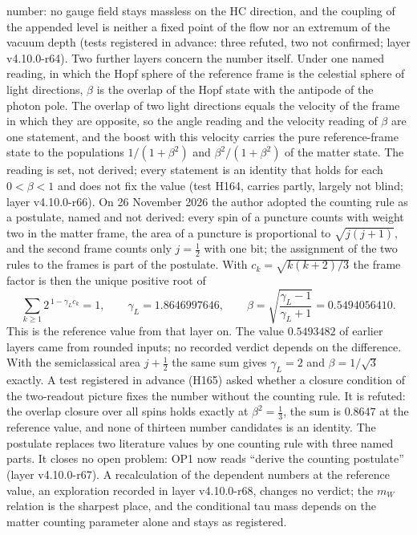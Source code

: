 number: no gauge field stays massless on the HC direction, and the
coupling of the appended level is neither a fixed point of the flow nor
an extremum of the vacuum depth (tests registered in advance: three
refuted, two not confirmed; layer v4.10.0-r64).
Two further layers concern the number itself. Under one named reading,
in which the Hopf sphere of the reference frame is the celestial sphere
of light directions, $\beta$ is the overlap of the Hopf state with the
antipode of the photon pole. The overlap of two light directions equals
the velocity of the frame in which they are opposite, so the angle
reading and the velocity reading of $\beta$ are one statement, and the
boost with this velocity carries the pure reference-frame state to the
populations $1/(1+\beta^2)$ and $\beta^2/(1+\beta^2)$ of the matter
state. The reading is set, not derived; every statement is an identity
that holds for each $0<\beta<1$ and does not fix the value (test H164,
carries partly, largely not blind; layer v4.10.0-r66).
On 26 November 2026 the author adopted the counting rule as a
postulate, named and not derived: every spin of a puncture counts with
weight two in the matter frame, the area of a puncture is proportional
to $\sqrt{j(j+1)}$, and the second frame counts only $j=\tfrac12$ with
one bit; the assignment of the two rules to the frames is part of the
postulate. With $c_k=\sqrt{k(k+2)/3}$ the frame factor is then the
unique positive root of
\begin{equation}
 \sum_{k\geq1}2^{\,1-\gamma_Lc_k}=1,\qquad
 \gamma_L=1.8646997646,\qquad
 \beta=\sqrt{\frac{\gamma_L-1}{\gamma_L+1}}=0.5494056410 .
\end{equation}
This is the reference value from that layer on. The value $0.5493482$
of earlier layers came from rounded inputs; no recorded verdict depends
on the difference. With the semiclassical area $j+\tfrac12$ the same
sum gives $\gamma_L=2$ and $\beta=1/\sqrt3$ exactly. A test registered
in advance (H165) asked whether a closure condition of the two-readout
picture fixes the number without the counting rule. It is refuted: the
overlap closure over all spins holds exactly at $\beta^2=\tfrac13$, the
sum is $0.8647$ at the reference value, and none of thirteen number
candidates is an identity. The postulate replaces two literature
values by one counting rule with three named parts. It closes no open
problem: OP1 now reads ``derive the counting postulate''
(layer v4.10.0-r67). A recalculation of the dependent numbers at the
reference value, an exploration recorded in layer v4.10.0-r68, changes no
verdict; the $m_W$ relation is the sharpest place, and the conditional
tau mass depends on the matter counting parameter alone and stays as
registered.

